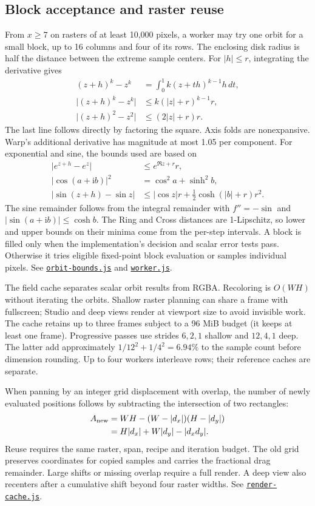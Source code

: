 \documentclass[11pt,a4paper]{article}
\numberwithin{equation}{section}
\newcommand{\abs}[1]{\lvert#1\rvert}
\newcommand{\ii}{\mathrm{i}}
\newcommand{\code}[1]{\texttt{#1}}
\begin{document}
\subsection{Block acceptance and raster reuse}

From \(x\ge7\) on rasters of at least 10,000 pixels, a worker may try
one orbit for a small block, up to 16 columns and four of its rows.
The enclosing disk radius is half the distance between the extreme
sample centers. For \(\abs h\le r\), integrating the derivative gives
\begin{align}
  (z+h)^k-z^k&=\int_0^1 k(z+th)^{k-1}h\,dt,\\
  \abs{(z+h)^k-z^k}&\le k(\abs z+r)^{k-1}r,\\
  \abs{(z+h)^2-z^2}&\le(2\abs z+r)r .
\end{align}
The last line follows directly by factoring the square. Axis folds are
nonexpansive. Warp's additional derivative has magnitude at most 1.05
per component. For exponential and sine, the bounds used are based on
\begin{align}
  \abs{e^{z+h}-e^z}&\le e^{\Re z+r}r,\\
  \abs{\cos(a+\ii b)}^2&=\cos^2 a+\sinh^2 b,\\
  \abs{\sin(z+h)-\sin z}
    &\le \abs{\cos z}r+\tfrac12\cosh(\abs b+r)r^2.
\end{align}
The sine remainder follows from the integral remainder with
\(f''=-\sin\) and \(\abs{\sin(a+\ii b)}\le\cosh b\).
The Ring and Cross distances are 1-Lipschitz, so lower and upper
bounds on their minima come from the per-step intervals. A block is
filled only when the implementation's decision and scalar error tests
pass. Otherwise it tries eligible fixed-point block evaluation or
samples individual pixels. See
\href{../dist/orbit-bounds.js}{\code{orbit-bounds.js}} and
\href{../dist/worker.js}{\code{worker.js}}.

The field cache separates scalar orbit results from RGBA. Recoloring
is \(O(WH)\) without iterating the orbits. Shallow raster planning
can share a frame with fullscreen; Studio and deep views render at
viewport size to avoid invisible work. The cache retains up to three
frames subject to a 96 MiB budget (it keeps at least one frame).
Progressive passes use strides \(6,2,1\) shallow and \(12,4,1\) deep.
The latter add approximately \(1/12^2+1/4^2=6.94\%\) to the sample
count before dimension rounding. Up to four workers interleave rows;
their reference caches are separate.

When panning by an integer grid displacement with overlap, the
number of newly evaluated positions follows by subtracting the
intersection of two rectangles:
\begin{align}
  A_{\rm new}
    &=WH-(W-\abs{d_x})(H-\abs{d_y})\\
    &=H\abs{d_x}+W\abs{d_y}-\abs{d_xd_y}.
\end{align}
Reuse requires the same raster, span, recipe and iteration budget.
The old grid preserves coordinates for copied samples and carries the
fractional drag remainder. Large shifts or missing overlap require a
full render. A deep view also recenters after a cumulative shift beyond
four raster widths. See
\href{../dist/render-cache.js}{\code{render-cache.js}}.
\end{document}
